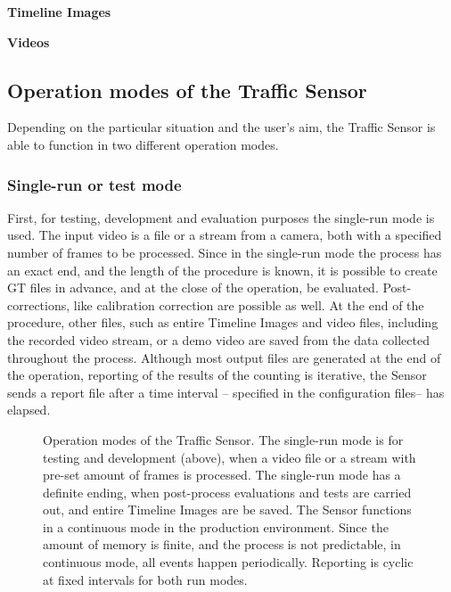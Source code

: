 \textbf{Timeline Images}

\textbf{Videos}
\subsection{Operation modes of the Traffic Sensor}
Depending on the particular situation and the user's aim, the Traffic Sensor is able to function in two different operation modes.
\subsubsection{Single-run or test mode}\label{sec:run_modes}
First, for testing, development and evaluation purposes the single-run mode is used.
The input video is a file or a stream from a camera, both with a specified number of frames to be processed.
Since in the single-run mode the process has an exact end, and the length of the procedure is known, it is possible to create GT files in advance, and at the close of the operation, be evaluated.
Post-corrections, like calibration correction are possible as well.
At the end of the procedure, other files, such as entire Timeline Images and video files, including the recorded video stream, or a demo video are saved from the data collected throughout the process.
Although most output files are generated at the end of the operation, reporting of the results of the counting is iterative, the Sensor sends a report file after a time interval -- specified in the configuration files-- has elapsed.

\begin{figure}[!h]
	\centering
	
	\caption{Operation modes of the Traffic Sensor. The single-run mode is for testing and development (above), when a video file or a stream with pre-set amount of frames is processed. The single-run mode has a definite ending, when post-process evaluations and tests are carried out, and entire Timeline Images are be saved. The Sensor functions in a continuous mode in the production environment. Since the amount of memory is finite, and the process is not predictable, in continuous mode, all events happen periodically. Reporting is cyclic at fixed intervals for both run modes. \label{fig:run_types}}
\end{figure}
